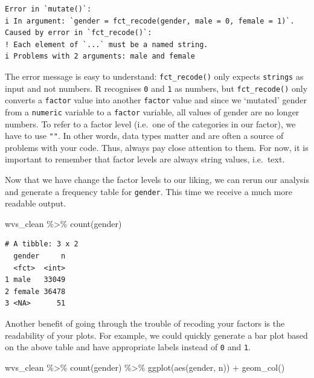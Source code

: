 \documentclass[
  letterpaper,
]{krantz}
\makeatletter
\newenvironment{Shaded}{\begin{snugshade}}{\end{snugshade}}
\newcommand{\FunctionTok}[1]{\textcolor[rgb]{0.28,0.35,0.67}{#1}}
\newcommand{\NormalTok}[1]{\textcolor[rgb]{0.00,0.23,0.31}{#1}}
\newcommand{\SpecialCharTok}[1]{\textcolor[rgb]{0.37,0.37,0.37}{#1}}
\newenvironment{kframe}{%
\medskip{}
\setlength{\fboxsep}{.8em}
 \def\at@end@of@kframe{}%
 \ifinner\ifhmode%
  \def\at@end@of@kframe{\end{minipage}}%
  \begin{minipage}{\columnwidth}%
 \fi\fi%
 \def\FrameCommand##1{\hskip\@totalleftmargin \hskip-\fboxsep
 \colorbox{shadecolor}{##1}\hskip-\fboxsep
     \hskip-\linewidth \hskip-\@totalleftmargin \hskip\columnwidth}%
 \MakeFramed {\advance\hsize-\width
   \@totalleftmargin\z@ \linewidth\hsize
   \@setminipage}}%
 {\par\unskip\endMakeFramed%
 \at@end@of@kframe}
\renewenvironment{Shaded}{\begin{kframe}}{\end{kframe}}
\makeatother
\begin{document}
\begin{verbatim}
Error in `mutate()`:
i In argument: `gender = fct_recode(gender, male = 0, female = 1)`.
Caused by error in `fct_recode()`:
! Each element of `...` must be a named string.
i Problems with 2 arguments: male and female
\end{verbatim}

The error message is easy to understand: \texttt{fct\_recode()} only
expects \texttt{strings} as input and not numbers. R recognises
\texttt{0} and \texttt{1} as numbers, but \texttt{fct\_recode()} only
converts a \texttt{factor} value into another \texttt{factor} value and
since we `mutated' gender from a \texttt{numeric} variable to a
\texttt{factor} variable, all values of gender are no longer numbers. To
refer to a factor level (i.e.~one of the categories in our factor), we
have to use \texttt{""}. In other words, data types matter and are often
a source of problems with your code. Thus, always pay close attention to
them. For now, it is important to remember that factor levels are always
string values, i.e.~text.

Now that we have change the factor levels to our liking, we can rerun
our analysis and generate a frequency table for \texttt{gender}. This
time we receive a much more readable output.

\begin{Shaded}
\begin{Highlighting}[]
\NormalTok{wvs\_clean }\SpecialCharTok{\%\textgreater{}\%} \FunctionTok{count}\NormalTok{(gender)}
\end{Highlighting}
\end{Shaded}

\begin{verbatim}
# A tibble: 3 x 2
  gender     n
  <fct>  <int>
1 male   33049
2 female 36478
3 <NA>      51
\end{verbatim}

Another benefit of going through the trouble of recoding your factors is
the readability of your plots. For example, we could quickly generate a
bar plot based on the above table and have appropriate labels instead of
\texttt{0} and \texttt{1}.

\begin{Shaded}
\begin{Highlighting}[]
\NormalTok{wvs\_clean }\SpecialCharTok{\%\textgreater{}\%}
  \FunctionTok{count}\NormalTok{(gender) }\SpecialCharTok{\%\textgreater{}\%}
  \FunctionTok{ggplot}\NormalTok{(}\FunctionTok{aes}\NormalTok{(gender, n)) }\SpecialCharTok{+}
  \FunctionTok{geom\_col}\NormalTok{()}
\end{Highlighting}
\end{Shaded}
\end{document}
